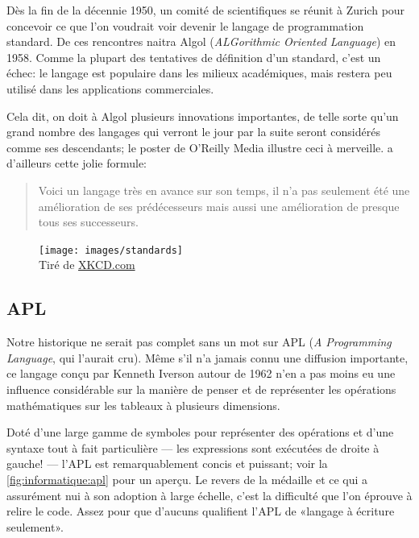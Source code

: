 Dès la fin de la décennie 1950, un comité de scientifiques se réunit à
Zurich pour concevoir ce que l'on voudrait voir devenir le langage de
programmation standard. De ces rencontres naitra Algol
(\emph{ALGorithmic Oriented Language}) en 1958. Comme la plupart des
tentatives de définition d'un standard, c'est un échec: le langage est
populaire dans les milieux académiques, mais restera peu utilisé dans
les applications commerciales.

Cela dit, on doit à Algol plusieurs innovations importantes, de telle
sorte qu'un grand nombre des langages qui verront le jour par la suite
seront considérés comme ses descendants; le poster
 de O'Reilly Media illustre ceci à
merveille. \citet{Hoare:1973} a d'ailleurs cette jolie formule:
\begin{quote}
  Voici un langage très en avance sur son temps, il n'a pas seulement
  été une amélioration de ses prédécesseurs mais aussi une
  amélioration de presque tous ses successeurs.
\end{quote}

\begin{figure}[t]
  \centering
  \begin{minipage}{0.9\linewidth}
    \texttt{[image: images/standards]} \\
    \footnotesize\sffamily%
    Tiré de \href{https://xkcd.com/927/}{XKCD.com}
  \end{minipage}
\end{figure}

\subsection{APL}
\label{sec:informatique:historique:apl}

Notre historique ne serait pas complet sans un mot sur APL
(\emph{A Programming Language}, qui l'aurait cru). Même s'il n'a
jamais connu une diffusion importante, ce langage conçu par Kenneth
Iverson autour de 1962 n'en a pas moins eu une influence considérable
sur la manière de penser et de représenter les opérations
mathématiques sur les tableaux à plusieurs dimensions.

Doté d'une large gamme de symboles pour représenter des opérations et
d'une syntaxe tout à fait particulière --- les expressions sont
exécutées de droite à gauche! --- l'APL est remarquablement concis et
puissant; voir la \autoref{fig:informatique:apl} pour un aperçu. Le
revers de la médaille et ce qui a assurément nui à son adoption
à large échelle, c'est la difficulté que l'on éprouve à relire le
code. Assez pour que d'aucuns qualifient l'APL de «langage à écriture
seulement».

